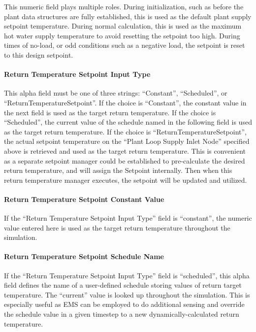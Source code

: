 This numeric field plays multiple roles. During initialization, such as before the plant data structures are fully established, this is used as the default plant supply setpoint temperature. During normal calculation, this is used as the maximum hot water supply temperature to avoid resetting the setpoint too high. During times of no-load, or odd conditions such as a negative load, the setpoint is reset to this design setpoint.

\paragraph{Return Temperature Setpoint Input Type}\label{return-temperature-setpoint-input-type-1}

This alpha field must be one of three strings: ``Constant'', ``Scheduled'', or ``ReturnTemperatureSetpoint''. If the choice is ``Constant'', the constant value in the next field is used as the target return temperature. If the choice is ``Scheduled'', the current value of the schedule named in the following field is used as the target return temperature. If the choice is ``ReturnTemperatureSetpoint'', the actual setpoint temperature on the ``Plant Loop Supply Inlet Node'' specified above is retrieved and used as the target return temperature. This is convenient as a separate setpoint manager could be established to pre-calculate the desired return temperature, and will assign the Setpoint internally. Then when this return temperature manager executes, the setpoint will be updated and utilized.

\paragraph{Return Temperature Setpoint Constant Value}\label{return-temperature-setpoint-constant-value-1}

If the ``Return Temperature Setpoint Input Type'' field is ``constant'', the numeric value entered here is used as the target return temperature throughout the simulation.

\paragraph{Return Temperature Setpoint Schedule Name}\label{return-temperature-setpoint-schedule-name-1}

If the ``Return Temperature Setpoint Input Type'' field is ``scheduled'', this alpha field defines the name of a user-defined schedule storing values of return target temperature. The ``current'' value is looked up throughout the simulation. This is especially useful as EMS can be employed to do additional sensing and override the schedule value in a given timestep to a new dynamically-calculated return temperature.

